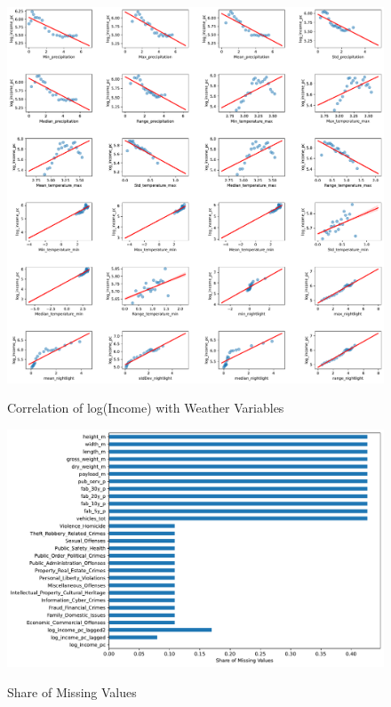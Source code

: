 \begin{figure}[H]
    \centering
    \caption{Correlation of log(Income) with Weather Variables}
    \includegraphics[width=1\textwidth]{../figures/figD_correlation_ml_dataset_weather_variables.pdf}
    \label{fig:enter-label}
\end{figure}


\begin{figure}[H]
    \centering
    \caption{Share of Missing Values}
    \includegraphics[width=1\textwidth]{../figures/figE_share_of_missings.pdf}
    \label{fig:enter-label}
\end{figure}
